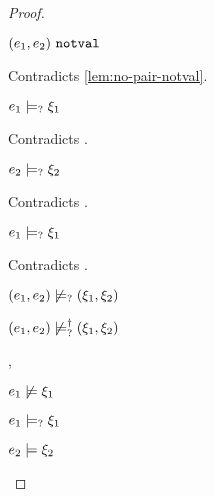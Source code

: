 \begin{proof}
\begin{byCases}
\begin{byCases}
\begin{byCases}
\begin{byCases}
\begin{pfsteps*}
                \item $(e_1 , e_2) ~\mathtt{notval}$ 
                \end{pfsteps*}
                Contradicts \autoref{lem:no-pair-notval}.
            \item[\text{(\ref{rule:CMSPair1})}]
                \begin{pfsteps*}
                \item $e_1 \models_{?} \xi_1$ 
                \end{pfsteps*}
                Contradicts .
            \item[\text{(\ref{rule:CMSPair2})}]
                \begin{pfsteps*}
                \item $e_2 \models_{?} \xi_2$ 
                \end{pfsteps*}
                Contradicts .
            \item[\text{(\ref{rule:CMSPair3})}]
                \begin{pfsteps*}
                \item $e_1 \models_{?} \xi_1$ 
                \end{pfsteps*}
                Contradicts .
            \end{byCases}
            \begin{pfsteps*}
            \item $(e_1 , e_2) \not\models_{?} (\xi_1 , \xi_2)$  
            \item $(e_1 , e_2) \not\models_{?}^{\dag} (\xi_1 , \xi_2)$ 
            \end{pfsteps*}
        \item[\cmaysatisfy{e_1}{\xi_1},\csatisfy{e_2}{\xi_2}]
            \begin{pfsteps*}
            \item $e_1 \not\models \xi_1$  
            \item $e_1 \models_{?} \xi_1$  
            \item $e_2 \models \xi_2$  

\end{pfsteps*}
\end{byCases}
\end{byCases}
\end{byCases}
\end{proof}
